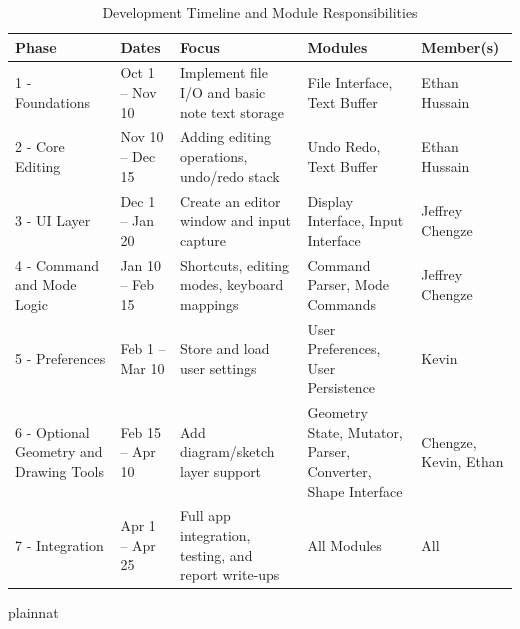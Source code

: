 \documentclass[12pt, titlepage]{article}
\begin{document}
\begin{table}[H]
\centering
\begin{tabularx}{\textwidth}{p{} p{} X p{} p{}}
\toprule
\textbf{Phase} & \textbf{Dates} & \textbf{Focus} & \textbf{Modules} & \textbf{Member(s)} \\
\midrule

1 - Foundations & Oct 1 -- Nov 10 & Implement file I/O and basic note text storage & File Interface, Text Buffer & Ethan Hussain \\

2 - Core Editing & Nov 10 -- Dec 15 & Adding editing operations, undo/redo stack & Undo Redo, Text Buffer & Ethan Hussain \\

3 - UI Layer & Dec 1 -- Jan 20 & Create an editor window and input capture & Display Interface, Input Interface & Jeffrey Chengze \\

4 - Command and Mode Logic & Jan 10 -- Feb 15 & Shortcuts, editing modes, keyboard mappings & Command Parser, Mode Commands & Jeffrey Chengze \\

5 - Preferences & Feb 1 -- Mar 10 & Store and load user settings & User Preferences, User Persistence & Kevin \\

6 - Optional Geometry and Drawing Tools & Feb 15 -- Apr 10 & Add diagram/sketch layer support & Geometry State, Mutator, Parser, Converter, Shape Interface & Chengze, Kevin, Ethan \\

7 - Integration & Apr 1 -- Apr 25 & Full app integration, testing, and report write-ups & All Modules & All \\

\bottomrule
\end{tabularx}
\caption{Development Timeline and Module Responsibilities}
\label{tab:timeline}
\end{table}

 {plainnat}



\newpage{}
\end{document}
